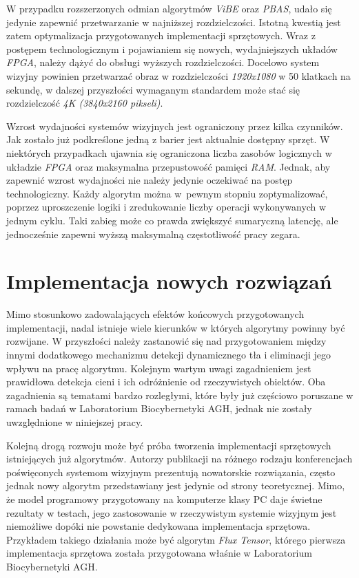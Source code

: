 W przypadku rozszerzonych odmian algorytmów \textit{ViBE} oraz \textit{PBAS}, udało się jedynie zapewnić przetwarzanie w najniższej rozdzielczości.
Istotną kwestią jest zatem optymalizacja przygotowanych implementacji sprzętowych. 
Wraz z postępem technologicznym i pojawianiem się nowych, wydajniejszych układów \textit{FPGA}, należy dążyć do obsługi wyższych rozdzielczości.
Docelowo system wizyjny powinien przetwarzać obraz w rozdzielczości \textit{1920x1080} w 50 klatkach na sekundę, w dalszej przyszłości wymaganym standardem może stać się rozdzielczość \textit{4K (3840x2160 pikseli)}.

Wzrost wydajności systemów wizyjnych jest ograniczony przez kilka czynników. 
Jak zostało już podkreślone jedną z barier jest aktualnie dostępny sprzęt. %
W niektórych przypadkach ujawnia się ograniczona liczba zasobów logicznych w układzie \textit{FPGA} oraz maksymalna przepustowość pamięci \textit{RAM}. Jednak, aby zapewnić wzrost wydajności nie należy jedynie oczekiwać na postęp technologiczny. Każdy algorytm można w~pewnym stopniu zoptymalizować, poprzez uproszczenie logiki i zredukowanie liczby operacji wykonywanych w jednym cyklu. Taki zabieg może co prawda zwiększyć sumaryczną latencję, ale jednocześnie zapewni wyższą maksymalną częstotliwość pracy zegara. 


\section{Implementacja nowych rozwiązań}
\label{sec:implementacja_nowych_rozwiazan}

Mimo stosunkowo zadowalających efektów końcowych przygotowanych implementacji, nadal istnieje wiele kierunków w których algorytmy powinny być rozwijane. 
W przyszłości należy zastanowić się nad przygotowaniem między innymi dodatkowego mechanizmu detekcji dynamicznego tła i eliminacji jego wpływu na pracę algorytmu. 
Kolejnym wartym uwagi zagadnieniem jest prawidłowa detekcja cieni i ich odróżnienie od rzeczywistych obiektów. 
Oba zagadnienia są tematami bardzo rozległymi, które były już częściowo poruszane w ramach badań w Laboratorium Biocybernetyki AGH, jednak nie zostały uwzględnione w niniejszej pracy.


Kolejną drogą rozwoju może być próba tworzenia implementacji sprzętowych istniejących już algorytmów. 
Autorzy publikacji na różnego rodzaju konferencjach poświęconych systemom wizyjnym prezentują nowatorskie rozwiązania, często jednak nowy algorytm przedstawiany jest jedynie od strony teoretycznej. 
Mimo, że model programowy przygotowany na komputerze klasy PC daje świetne rezultaty w testach, jego zastosowanie w rzeczywistym systemie wizyjnym jest niemożliwe dopóki nie powstanie dedykowana implementacja sprzętowa. 
Przykładem takiego działania może być algorytm \textit{Flux Tensor}, którego pierwsza implementacja sprzętowa \cite{janus_16_flux} została przygotowana właśnie w Laboratorium Biocybernetyki AGH.
